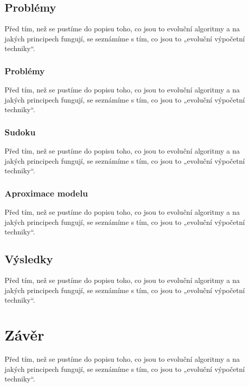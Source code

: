 \documentclass[bc,male,java,dept460]{diploma}		%
\begin{document}
\subsection{Problémy}
Před tím, než se pustíme do popisu toho, co jsou to evoluční algoritmy a na jakých principech fungují, se seznámíme s tím, co jsou to „evoluční výpočetní techniky“.

\subsubsection{Problémy}
Před tím, než se pustíme do popisu toho, co jsou to evoluční algoritmy a na jakých principech fungují, se seznámíme s tím, co jsou to „evoluční výpočetní techniky“.

\subsubsection{Sudoku}
Před tím, než se pustíme do popisu toho, co jsou to evoluční algoritmy a na jakých principech fungují, se seznámíme s tím, co jsou to „evoluční výpočetní techniky“.

\subsubsection{Aproximace modelu}
Před tím, než se pustíme do popisu toho, co jsou to evoluční algoritmy a na jakých principech fungují, se seznámíme s tím, co jsou to „evoluční výpočetní techniky“.

\subsection{Výsledky}
Před tím, než se pustíme do popisu toho, co jsou to evoluční algoritmy a na jakých principech fungují, se seznámíme s tím, co jsou to „evoluční výpočetní techniky“.

\section{Závěr}
Před tím, než se pustíme do popisu toho, co jsou to evoluční algoritmy a na jakých principech fungují, se seznámíme s tím, co jsou to „evoluční výpočetní techniky“.
\end{document}
